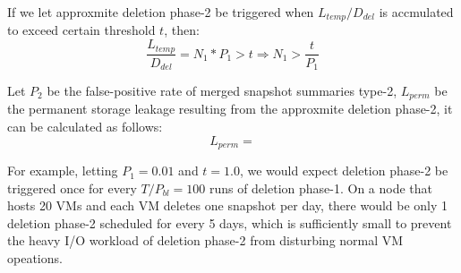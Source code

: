 If we let approxmite deletion phase-2 be triggered  
when $L_{temp}/D_{del}$ is accmulated to exceed certain threshold $t$, then:
\begin{equation}
\frac{L_{temp}}{D_{del}} = N_1 * P_1 > t \Rightarrow N_{1} > \frac{t}{P_1}
\end{equation}

Let $P_{2}$ be the false-positive rate of merged snapshot summaries type-2,
$L_{perm}$ be the permanent storage leakage resulting from the approxmite deletion phase-2,
it can be calculated as follows: 
\begin{equation}
L_{perm} = 
\end{equation}

For example, letting $P_1 = 0.01$ and $t=1.0$, 
we would expect deletion phase-2 be triggered once for 
every $T/P_{bl} = 100$ runs of deletion phase-1.
On a node that hosts 20 VMs and each VM deletes one snapshot per day, there would be 
only 1 deletion phase-2 scheduled for every 5 days, which is sufficiently small to prevent the 
heavy I/O workload of deletion phase-2 from disturbing normal VM opeations.



